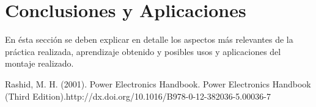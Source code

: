 \documentclass[letterpaper, 12pt]{report}
\begin{document}
\newpage

\section{Conclusiones y Aplicaciones}
En \'esta secci\'on se deben explicar en detalle los aspectos m\'as relevantes de la pr\'actica realizada, aprendizaje obtenido y posibles usos y aplicaciones del montaje realizado. 

\begin{thebibliography}{9}
 Rashid, M. H. (2001). Power Electronics Handbook. Power Electronics Handbook (Third Edition).http://dx.doi.org/10.1016/B978-0-12-382036-5.00036-7
\end{thebibliography}
\end{document}
